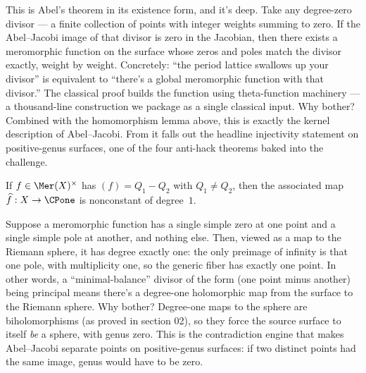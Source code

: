 \begin{layman}
This is Abel's theorem in its existence form, and it's deep. Take any
degree-zero divisor — a finite collection of points with integer weights
summing to zero. If the Abel–Jacobi image of that divisor is zero in
the Jacobian, then there exists a meromorphic function on the surface
whose zeros and poles match the divisor exactly, weight by weight.
Concretely: ``the period lattice swallows up your divisor'' is
equivalent to ``there's a global meromorphic function with that
divisor.'' The classical proof builds the function using
theta-function machinery — a thousand-line construction we package as a
single classical input. Why bother? Combined with the homomorphism
lemma above, this is exactly the kernel description of Abel–Jacobi.
From it falls out the headline injectivity statement on positive-genus
surfaces, one of the four anti-hack theorems baked into the challenge.
\end{layman}

\begin{lemma}
\label{lem:principal-deg0-simple-support-deg1}
If \(f\in\Mer(X)^{\times}\) has \((f)=Q_1-Q_2\) with \(Q_1\ne Q_2\), then
the associated map \(\widehat{f}:X\to\CPone\) is nonconstant of
degree~\(1\).
\notready
\end{lemma}

\begin{layman}
Suppose a meromorphic function has a single simple zero at one point
and a single simple pole at another, and nothing else. Then, viewed as
a map to the Riemann sphere, it has degree exactly one: the only
preimage of infinity is that one pole, with multiplicity one, so the
generic fiber has exactly one point. In other words, a
``minimal-balance'' divisor of the form (one point minus another) being
principal means there's a degree-one holomorphic map from the surface
to the Riemann sphere. Why bother? Degree-one maps to the sphere are
biholomorphisms (as proved in section 02), so they force the source
surface to itself \emph{be} a sphere, with genus zero. This is the
contradiction engine that makes Abel–Jacobi separate points on
positive-genus surfaces: if two distinct points had the same image,
genus would have to be zero.
\end{layman}


